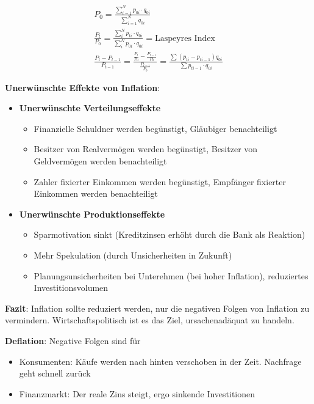 \documentclass[9pt, landscape, fleqn]{scrartcl}
\begin{document}
\begin{multicols*}{3}
\begin{align}
    P_0 = \frac{\sum_{i=1}^N p_{0i}\cdot q_{0i}}{\sum_{i=1}^N q_{0i}} \\
    \frac{P_t}{P_0} = \frac{\sum_i^N p_{ti}\cdot q_{0i}}{\sum_i^N p_{0i}\cdot q_{0i}} = \text{Laspeyres Index}\\
    \frac{P_t-P_{t-1}}{P_{t-1}} = \frac{\frac{P_t}{P_0}-\frac{P_{t-1}}{P_0}}{\frac{P_{t-1}}{P_0}} = \frac{\sum(p_{ti}-p_{ti-1})q_{0i}}{\sum p_{ti-1}\cdot q_{0i}}
\end{align}

\textbf{Unerwünschte Effekte von Inflation}:

\begin{itemize}
    \item \textbf{Unerwünschte Verteilungseffekte}
    \begin{itemize}
        \item Finanzielle Schuldner werden begünstigt, Gläubiger benachteiligt 
        \item Besitzer von Realvermögen werden begünstigt, Besitzer von Geldvermögen werden benachteiligt 
        \item Zahler fixierter Einkommen werden begünstigt, Empfänger fixierter Einkommen werden benachteiligt 
    \end{itemize}
    \item \textbf{Unerwünschte Produktionseffekte}
    \begin{itemize}
        \item Sparmotivation sinkt (Kreditzinsen erhöht durch die Bank als Reaktion)
        \item Mehr Spekulation (durch Unsicherheiten in Zukunft)
        \item Planungsunsicherheiten bei Unterehmen (bei hoher Inflation), reduziertes Investitionsvolumen
    \end{itemize}
\end{itemize}

\textbf{Fazit}: Inflation sollte reduziert werden, nur die negativen Folgen von Inflation zu vermindern. Wirtschaftspolitisch ist es das Ziel, ursachenadäquat zu handeln. \newline

\textbf{Deflation}: Negative Folgen sind für

\begin{itemize}
    \item Konsumenten: Käufe werden nach hinten verschoben in der Zeit. Nachfrage geht schnell zurück 
    \item Finanzmarkt: Der reale Zins steigt, ergo sinkende Investitionen 
\end{itemize}


\end{multicols*}
\end{document}
